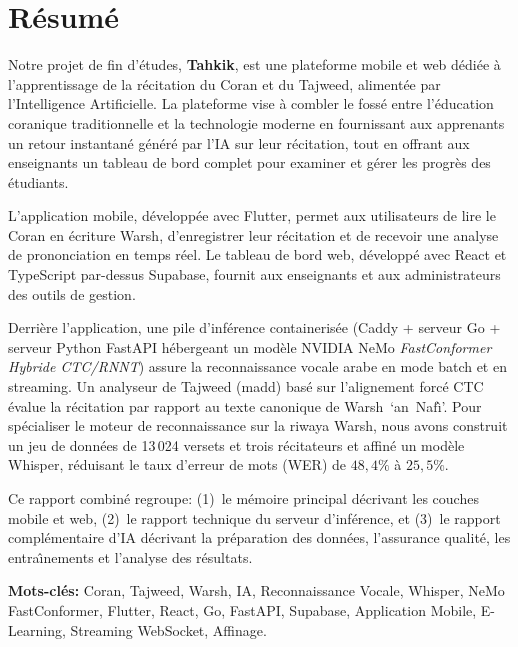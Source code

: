 \vspace{0.8cm}

\section*{R\'esum\'e}
Notre projet de fin d'\'etudes, \textbf{Tahkik}, est une plateforme
mobile et web d\'edi\'ee \`a l'apprentissage de la r\'ecitation du Coran
et du Tajweed, aliment\'ee par l'Intelligence Artificielle. La plateforme
vise \`a combler le foss\'e entre l'\'education coranique traditionnelle
et la technologie moderne en fournissant aux apprenants un retour
instantan\'e g\'en\'er\'e par l'IA sur leur r\'ecitation, tout en offrant
aux enseignants un tableau de bord complet pour examiner et g\'erer les
progr\`es des \'etudiants.

L'application mobile, d\'evelopp\'ee avec Flutter, permet aux utilisateurs
de lire le Coran en \'ecriture Warsh, d'enregistrer leur r\'ecitation et
de recevoir une analyse de prononciation en temps r\'eel. Le tableau de
bord web, d\'evelopp\'e avec React et TypeScript par-dessus Supabase,
fournit aux enseignants et aux administrateurs des outils de gestion.

Derri\`ere l'application, une pile d'inf\'erence containeris\'ee
(Caddy + serveur Go + serveur Python FastAPI h\'ebergeant un mod\`ele
NVIDIA NeMo \textit{FastConformer Hybride CTC/RNNT}) assure la
reconnaissance vocale arabe en mode batch et en streaming. Un analyseur
de Tajweed (madd) bas\'e sur l'alignement forc\'e CTC \'evalue la
r\'ecitation par rapport au texte canonique de Warsh~`an~Naf{\^\i}'.
Pour sp\'ecialiser le moteur de reconnaissance sur la riwaya Warsh, nous
avons construit un jeu de donn\'ees de 13{\,}024 versets et trois
r\'ecitateurs et affin\'e un mod\`ele Whisper, r\'eduisant le taux
d'erreur de mots (WER) de $48{,}4\%$ \`a $25{,}5\%$.

Ce rapport combin\'e regroupe: (1)~le m\'emoire principal d\'ecrivant
les couches mobile et web, (2)~le rapport technique du serveur
d'inf\'erence, et (3)~le rapport compl\'ementaire d'IA d\'ecrivant la
pr\'eparation des donn\'ees, l'assurance qualit\'e, les entra{\^\i}nements
et l'analyse des r\'esultats.

\textbf{Mots-cl\'es:} Coran, Tajweed, Warsh, IA, Reconnaissance Vocale,
Whisper, NeMo FastConformer, Flutter, React, Go, FastAPI, Supabase,
Application Mobile, E-Learning, Streaming WebSocket, Affinage.

\newpage
